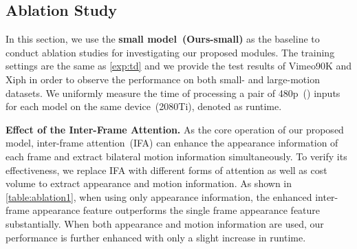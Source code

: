 \documentclass[10pt,twocolumn,letterpaper]{article}
\begin{document}
    
    \subsection{Ablation Study}
    \label{exp:ab}
    In this section, we use the \textbf{small model~(Ours-small)} as the baseline to conduct ablation studies for investigating our proposed modules. The training settings are the same as \cref{exp:td} and we provide the test results of Vimeo90K and Xiph in order to observe the performance on both small- and large-motion datasets. We uniformly measure the time of processing a pair of 480p~() inputs for each model on the same device~(2080Ti), denoted as runtime.
    
     \noindent
     \textbf{Effect of the Inter-Frame Attention.} As the core operation of our proposed model, inter-frame attention~(IFA) can enhance the appearance information of each frame and extract bilateral motion information simultaneously. To verify its effectiveness, we replace IFA with different forms of attention as well as cost volume to extract appearance and motion information. As shown in \cref{table:ablation1}, when using only appearance information, the enhanced inter-frame appearance feature outperforms the single frame appearance feature substantially. When both appearance and motion information are used, our performance is further enhanced with only a slight increase in runtime.

    \begin{table}
\centering
    \vspace{-0.25in}
    \end{table}
\end{document}
